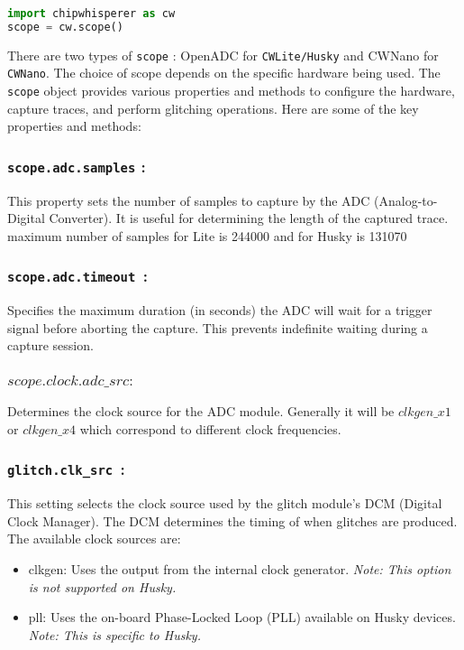 \begin{lstlisting}[language=Python]
import chipwhisperer as cw
scope = cw.scope()
\end{lstlisting}

There are two types of \texttt{scope} : OpenADC for \texttt{CWLite/Husky} and CWNano for \texttt{CWNano}. The choice of scope depends on the specific hardware being used.
The \texttt{scope} object provides various properties and methods to configure the hardware, capture traces, and perform glitching operations. Here are some of the key properties and methods:
\subsubsection{\textbf{\texttt{scope.adc.samples} :}}
This property sets the number of samples to capture by the  ADC (Analog-to-Digital Converter). It is useful for determining the length of the captured trace.
maximum number of samples for Lite is 244000 and for Husky is 131070

\subsubsection{\textbf{\texttt{scope.adc.timeout }:}}
  
Specifies the maximum duration (in seconds) the ADC will wait for a trigger signal before aborting the capture. This prevents indefinite waiting during a capture session.
\subsubsection{$scope.clock.adc\_src :$}

Determines the clock source for the  ADC  module. Generally it will be $clkgen\_x1$ or $clkgen\_x4$ which correspond to different clock frequencies.
\subsubsection{\textbf{\texttt{glitch.clk\_src }:}}

This setting selects the clock source used by the glitch module's DCM (Digital Clock Manager). The DCM determines the timing of when glitches are produced.
The available clock sources are:

\begin{itemize}
  \item clkgen: Uses the output from the internal clock generator. \textit{Note: This option is not supported on Husky.}
  \item pll: Uses the on-board Phase-Locked Loop (PLL) available on Husky devices. \textit{Note: This is specific to Husky.}
\end{itemize}

